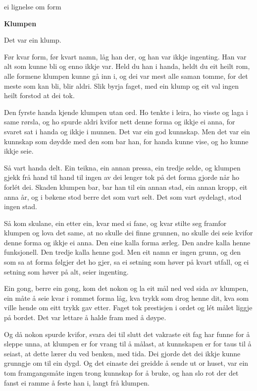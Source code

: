 \documentclass[11pt]{article}
\begin{document}
{\footnotesize{}\color{gray}ei lignelse om form}

\vspace{3mm}
{\fontsize{22}{25}\selectfont\bfseries Klumpen}

\vspace{2mm}\noindent{\color{gray}\rule{14mm}{0.4pt}}

\vspace{5mm}

{\large Det var ein klump.}

Før kvar form, før kvart namn, låg han der, og han var ikkje ingenting. Han var alt som kunne bli og enno ikkje var. Held du han i handa, heldt du eit heilt rom, alle formene klumpen kunne gå inn i, og dei var mest alle saman tomme, for det meste som kan bli, blir aldri. Slik byrja faget, med ein klump og eit val ingen heilt forstod at dei tok.

Den fyrste handa kjende klumpen utan ord. Ho tenkte i leira, ho visste og laga i same rørsla, og ho spurde aldri kvifor nett denne forma og ikkje ei anna, for svaret sat i handa og ikkje i munnen. Det var ein god kunnskap. Men det var ein kunnskap som døydde med den som bar han, for handa kunne vise, og ho kunne ikkje seie.

Så vart handa delt. Ein teikna, ein annan pressa, ein tredje selde, og klumpen gjekk frå hand til hand til ingen av dei lenger tok på det forma gjorde når ho forlét dei. Skaden klumpen bar, bar han til ein annan stad, ein annan kropp, eit anna år, og i bøkene stod berre det som vart selt. Det som vart øydelagt, stod ingen stad.

Så kom skulane, ein etter ein, kvar med si fane, og kvar stilte seg framfor klumpen og lova det same, at no skulle dei finne grunnen, no skulle dei seie kvifor denne forma og ikkje ei anna. Den eine kalla forma ærleg. Den andre kalla henne funksjonell. Den tredje kalla henne god. Men eit namn er ingen grunn, og den som sa at forma følgjer det ho gjer, sa ei setning som høver på kvart utfall, og ei setning som høver på alt, seier ingenting.

Ein gong, berre ein gong, kom det nokon og la eit mål ned ved sida av klumpen, ein måte å seie kvar i rommet forma låg, kva trykk som drog henne dit, kva som ville hende om eitt trykk gav etter. Faget tok prestisjen i ordet og lét målet liggje på bordet. Det var lettare å halde fram med å døype.

Og då nokon spurde kvifor, svara dei til slutt det vakraste eit fag har funne for å sleppe unna, at klumpen er for vrang til å målast, at kunnskapen er for taus til å seiast, at dette lærer du ved benken, med tida. Dei gjorde det dei ikkje kunne grunngje om til ein dygd. Og det einaste dei greidde å sende ut or huset, var ein tom framgangsmåte ingen trong kunnskap for å bruke, og han slo rot der det fanst ei ramme å feste han i, langt frå klumpen.
\end{document}
